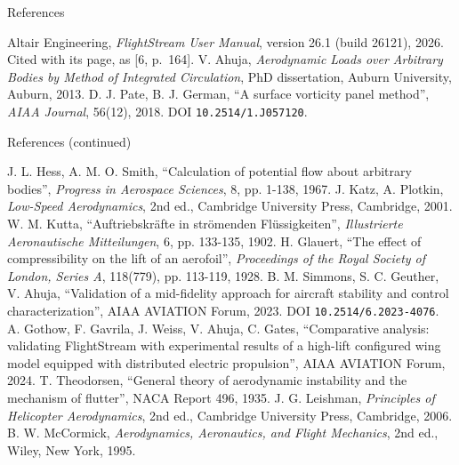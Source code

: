 \documentclass[aspectratio=169,11pt]{beamer}
\begin{document}






\begin{frame}{References}
\begin{reflist}
   
   
   
   
   \recordsref
   Altair Engineering, \emph{FlightStream User Manual}, version 26.1
        (build 26121), 2026. Cited with its page, as [6, p.~164].
   V. Ahuja, \emph{Aerodynamic Loads over Arbitrary Bodies by Method
        of Integrated Circulation}, PhD dissertation, Auburn University, Auburn,
        2013.
   D. J. Pate, B. J. German, ``A surface vorticity panel method'',
        \emph{AIAA Journal}, 56(12), 2018. DOI \texttt{10.2514/1.J057120}.
\end{reflist}
\end{frame}

\begin{frame}{References (continued)}
\begin{reflist}
  \setcounter{enumi}{8}
   J. L. Hess, A. M. O. Smith, ``Calculation of potential flow about
        arbitrary bodies'', \emph{Progress in Aerospace Sciences}, 8,
        pp. 1-138, 1967.
   J. Katz, A. Plotkin, \emph{Low-Speed Aerodynamics}, 2nd ed.,
        Cambridge University Press, Cambridge, 2001.
   W. M. Kutta, ``Auftriebskr\"afte in str\"omenden Fl\"ussigkeiten'',
        \emph{Illustrierte Aeronautische Mitteilungen}, 6, pp. 133-135, 1902.
   H. Glauert, ``The effect of compressibility on the lift of an
        aerofoil'', \emph{Proceedings of the Royal Society of London, Series
        A}, 118(779), pp. 113-119, 1928.
   B. M. Simmons, S. C. Geuther, V. Ahuja, ``Validation of a
        mid-fidelity approach for aircraft stability and control
        characterization'', AIAA AVIATION Forum, 2023. DOI
        \texttt{10.2514/6.2023-4076}.
   A. Gothow, F. Gavrila, J. Weiss, V. Ahuja, C. Gates,
        ``Comparative analysis: validating FlightStream with experimental
        results of a high-lift configured wing model equipped with distributed
        electric propulsion'', AIAA AVIATION Forum, 2024.
   T. Theodorsen, ``General theory of aerodynamic instability and the
        mechanism of flutter'', NACA Report 496, 1935.
   J. G. Leishman, \emph{Principles of Helicopter Aerodynamics}, 2nd
        ed., Cambridge University Press, Cambridge, 2006.
   B. W. McCormick, \emph{Aerodynamics, Aeronautics, and Flight
        Mechanics}, 2nd ed., Wiley, New York, 1995.
\end{reflist}
\end{frame}
\end{document}

